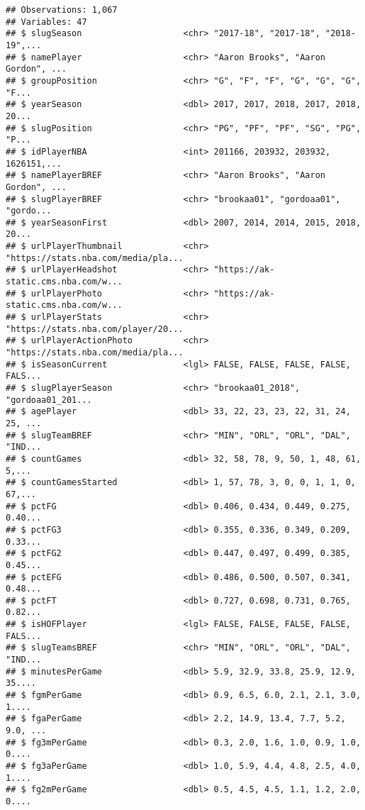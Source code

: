 \documentclass[]{article}
\begin{document}
\begin{verbatim}
## Observations: 1,067
## Variables: 47
## $ slugSeason                    <chr> "2017-18", "2017-18", "2018-19",...
## $ namePlayer                    <chr> "Aaron Brooks", "Aaron Gordon", ...
## $ groupPosition                 <chr> "G", "F", "F", "G", "G", "G", "F...
## $ yearSeason                    <dbl> 2017, 2017, 2018, 2017, 2018, 20...
## $ slugPosition                  <chr> "PG", "PF", "PF", "SG", "PG", "P...
## $ idPlayerNBA                   <int> 201166, 203932, 203932, 1626151,...
## $ namePlayerBREF                <chr> "Aaron Brooks", "Aaron Gordon", ...
## $ slugPlayerBREF                <chr> "brookaa01", "gordoaa01", "gordo...
## $ yearSeasonFirst               <dbl> 2007, 2014, 2014, 2015, 2018, 20...
## $ urlPlayerThumbnail            <chr> "https://stats.nba.com/media/pla...
## $ urlPlayerHeadshot             <chr> "https://ak-static.cms.nba.com/w...
## $ urlPlayerPhoto                <chr> "https://ak-static.cms.nba.com/w...
## $ urlPlayerStats                <chr> "https://stats.nba.com/player/20...
## $ urlPlayerActionPhoto          <chr> "https://stats.nba.com/media/pla...
## $ isSeasonCurrent               <lgl> FALSE, FALSE, FALSE, FALSE, FALS...
## $ slugPlayerSeason              <chr> "brookaa01_2018", "gordoaa01_201...
## $ agePlayer                     <dbl> 33, 22, 23, 23, 22, 31, 24, 25, ...
## $ slugTeamBREF                  <chr> "MIN", "ORL", "ORL", "DAL", "IND...
## $ countGames                    <dbl> 32, 58, 78, 9, 50, 1, 48, 61, 5,...
## $ countGamesStarted             <dbl> 1, 57, 78, 3, 0, 0, 1, 1, 0, 67,...
## $ pctFG                         <dbl> 0.406, 0.434, 0.449, 0.275, 0.40...
## $ pctFG3                        <dbl> 0.355, 0.336, 0.349, 0.209, 0.33...
## $ pctFG2                        <dbl> 0.447, 0.497, 0.499, 0.385, 0.45...
## $ pctEFG                        <dbl> 0.486, 0.500, 0.507, 0.341, 0.48...
## $ pctFT                         <dbl> 0.727, 0.698, 0.731, 0.765, 0.82...
## $ isHOFPlayer                   <lgl> FALSE, FALSE, FALSE, FALSE, FALS...
## $ slugTeamsBREF                 <chr> "MIN", "ORL", "ORL", "DAL", "IND...
## $ minutesPerGame                <dbl> 5.9, 32.9, 33.8, 25.9, 12.9, 35....
## $ fgmPerGame                    <dbl> 0.9, 6.5, 6.0, 2.1, 2.1, 3.0, 1....
## $ fgaPerGame                    <dbl> 2.2, 14.9, 13.4, 7.7, 5.2, 9.0, ...
## $ fg3mPerGame                   <dbl> 0.3, 2.0, 1.6, 1.0, 0.9, 1.0, 0....
## $ fg3aPerGame                   <dbl> 1.0, 5.9, 4.4, 4.8, 2.5, 4.0, 1....
## $ fg2mPerGame                   <dbl> 0.5, 4.5, 4.5, 1.1, 1.2, 2.0, 0....

\end{verbatim}
\end{document}
